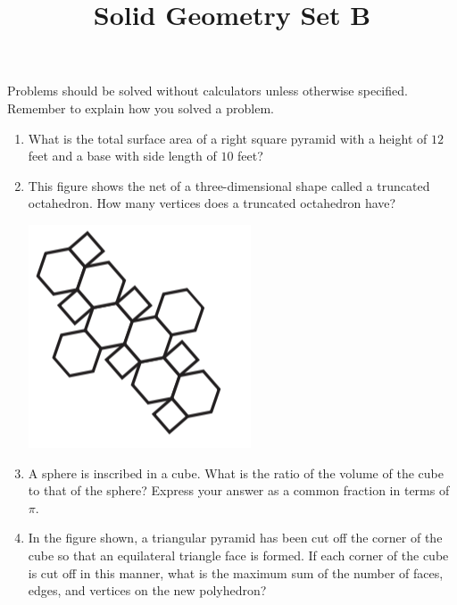 \documentclass{article}
\title{Solid Geometry Set B}
\author{}
\date{}
\begin{document}
\maketitle
\noindent Problems should be solved without calculators unless otherwise specified.
Remember to explain how you solved a problem.
\begin{multicols}{2}
    \begin{enumerate}
        \item What is the total surface area of a right square pyramid with a height of $12$ feet and a base with side length of $10$ feet?
            \vspace{3cm}
        \item This figure shows the net of a three-dimensional shape called a truncated octahedron.
            How many vertices does a truncated octahedron have?
            \begin{center}
                \includegraphics[scale=0.5]{truncated_octahedron.png}
            \end{center}
            \vspace{3cm}
        \item A sphere is inscribed in a cube.
            What is the ratio of the volume of the cube to that of the sphere?
            Express your answer as a common fraction in terms of $\pi$.
            \vspace{3cm}
        \item In the figure shown, a triangular pyramid has been cut off the corner of the cube so that an equilateral triangle face is formed.
            If each corner of the cube is cut off in this manner, what is the maximum sum of the number of faces, edges, and vertices on the new polyhedron?
            \begin{center}
\end{center}
\end{enumerate}
\end{multicols}
\end{document}
